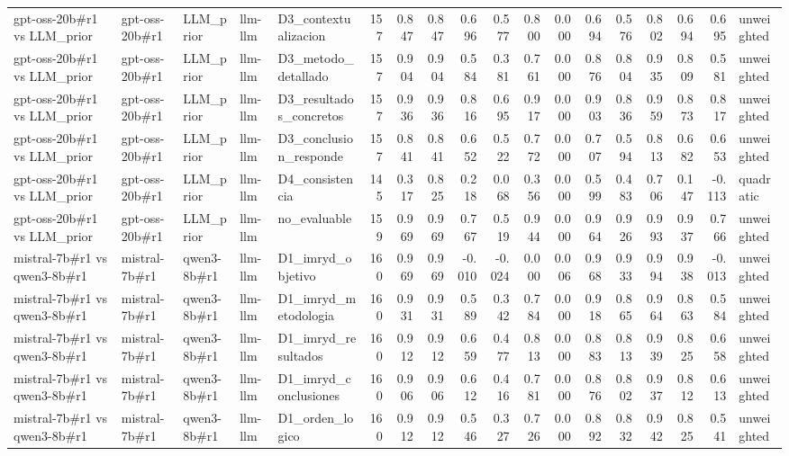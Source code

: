 \begin{table}
{\begin{tabular}{lllllrrrrrrrrrrrrl}
gpt-oss-20b\#r1 vs LLM\_prior & gpt-oss-20b\#r1 & LLM\_prior & llm-llm & D3\_contextualizacion & 157 & 0.847 & 0.847 & 0.696 & 0.577 & 0.800 & 0.000 & 0.694 & 0.576 & 0.802 & 0.694 & 0.695 & unweighted \\
gpt-oss-20b\#r1 vs LLM\_prior & gpt-oss-20b\#r1 & LLM\_prior & llm-llm & D3\_metodo\_detallado & 157 & 0.904 & 0.904 & 0.584 & 0.381 & 0.761 & 0.000 & 0.876 & 0.804 & 0.935 & 0.809 & 0.581 & unweighted \\
gpt-oss-20b\#r1 vs LLM\_prior & gpt-oss-20b\#r1 & LLM\_prior & llm-llm & D3\_resultados\_concretos & 157 & 0.936 & 0.936 & 0.816 & 0.695 & 0.917 & 0.000 & 0.903 & 0.836 & 0.959 & 0.873 & 0.817 & unweighted \\
gpt-oss-20b\#r1 vs LLM\_prior & gpt-oss-20b\#r1 & LLM\_prior & llm-llm & D3\_conclusion\_responde & 157 & 0.841 & 0.841 & 0.652 & 0.522 & 0.772 & 0.000 & 0.707 & 0.594 & 0.813 & 0.682 & 0.653 & unweighted \\
gpt-oss-20b\#r1 vs LLM\_prior & gpt-oss-20b\#r1 & LLM\_prior & llm-llm & D4\_consistencia & 145 & 0.317 & 0.825 & 0.218 & 0.068 & 0.356 & 0.000 & 0.599 & 0.483 & 0.706 & 0.147 & -0.113 & quadratic \\
gpt-oss-20b\#r1 vs LLM\_prior & gpt-oss-20b\#r1 & LLM\_prior & llm-llm & no\_evaluable & 159 & 0.969 & 0.969 & 0.767 & 0.519 & 0.944 & 0.000 & 0.964 & 0.926 & 0.993 & 0.937 & 0.766 & unweighted \\
mistral-7b\#r1 vs qwen3-8b\#r1 & mistral-7b\#r1 & qwen3-8b\#r1 & llm-llm & D1\_imryd\_objetivo & 160 & 0.969 & 0.969 & -0.010 & -0.024 & 0.000 & 0.006 & 0.968 & 0.933 & 0.994 & 0.938 & -0.013 & unweighted \\
mistral-7b\#r1 vs qwen3-8b\#r1 & mistral-7b\#r1 & qwen3-8b\#r1 & llm-llm & D1\_imryd\_metodologia & 160 & 0.931 & 0.931 & 0.589 & 0.342 & 0.784 & 0.000 & 0.918 & 0.865 & 0.964 & 0.863 & 0.584 & unweighted \\
mistral-7b\#r1 vs qwen3-8b\#r1 & mistral-7b\#r1 & qwen3-8b\#r1 & llm-llm & D1\_imryd\_resultados & 160 & 0.912 & 0.912 & 0.659 & 0.477 & 0.813 & 0.000 & 0.883 & 0.813 & 0.939 & 0.825 & 0.658 & unweighted \\
mistral-7b\#r1 vs qwen3-8b\#r1 & mistral-7b\#r1 & qwen3-8b\#r1 & llm-llm & D1\_imryd\_conclusiones & 160 & 0.906 & 0.906 & 0.612 & 0.416 & 0.781 & 0.000 & 0.876 & 0.802 & 0.937 & 0.812 & 0.613 & unweighted \\
mistral-7b\#r1 vs qwen3-8b\#r1 & mistral-7b\#r1 & qwen3-8b\#r1 & llm-llm & D1\_orden\_logico & 160 & 0.912 & 0.912 & 0.546 & 0.327 & 0.726 & 0.000 & 0.892 & 0.832 & 0.942 & 0.825 & 0.541 & unweighted \\

\end{tabular}}
\end{table}
